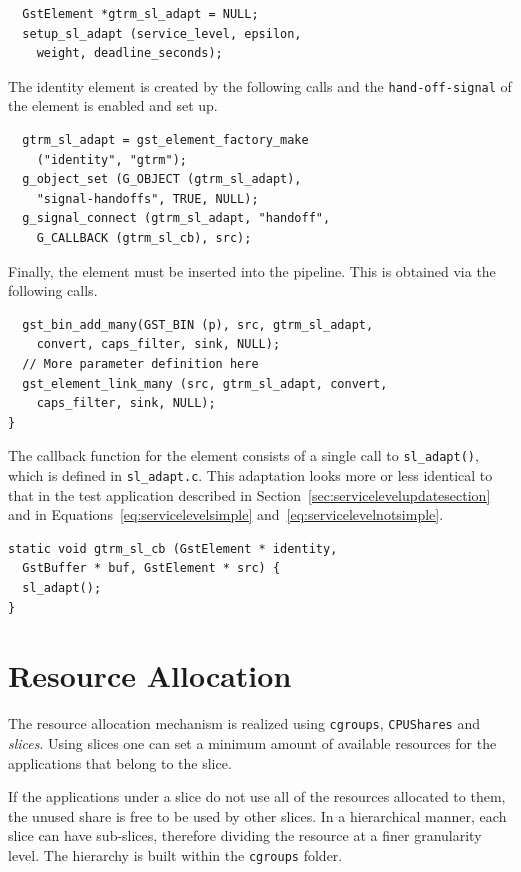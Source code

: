 \documentclass[nobiblatex]{LTHthesis}
\begin{document}
\begin{lstlisting}
  GstElement *gtrm_sl_adapt = NULL;
  setup_sl_adapt (service_level, epsilon, 
    weight, deadline_seconds);
\end{lstlisting}

The identity element is created by the following calls and the 
\texttt{hand-off-signal} of the element is enabled and set up.

\begin{lstlisting}
  gtrm_sl_adapt = gst_element_factory_make 
    ("identity", "gtrm");
  g_object_set (G_OBJECT (gtrm_sl_adapt), 
    "signal-handoffs", TRUE, NULL);
  g_signal_connect (gtrm_sl_adapt, "handoff", 
    G_CALLBACK (gtrm_sl_cb), src);
\end{lstlisting}

Finally, the element must be inserted into the pipeline. This is obtained
via the following calls.

\begin{lstlisting}
  gst_bin_add_many(GST_BIN (p), src, gtrm_sl_adapt, 
    convert, caps_filter, sink, NULL);
  // More parameter definition here
  gst_element_link_many (src, gtrm_sl_adapt, convert, 
    caps_filter, sink, NULL);
}
\end{lstlisting}

The callback function for the element consists of a single call 
to \texttt{sl\_adapt()}, which is defined in \texttt{sl\_adapt.c}. 
This adaptation looks more or less identical to that in the test 
application described in Section~\ref{sec:servicelevelupdatesection} and
in Equations~\eqref{eq:servicelevelsimple} 
and~\eqref{eq:servicelevelnotsimple}.

\begin{lstlisting}
static void gtrm_sl_cb (GstElement * identity, 
  GstBuffer * buf, GstElement * src) {
  sl_adapt();
}
\end{lstlisting}

\section{Resource Allocation}

The resource allocation mechanism is realized using \texttt{cgroups},
\texttt{CPUShares} and \emph{slices}. Using slices one can set a minimum
amount of available resources for the applications that belong to the slice.

If the applications under a slice do not use all of the resources allocated 
to them, the unused share is free to be used by other slices. In a
hierarchical manner, each slice can have sub-slices, therefore dividing the resource at a finer granularity level. The hierarchy is built within the
\texttt{cgroups} folder.
\end{document}
